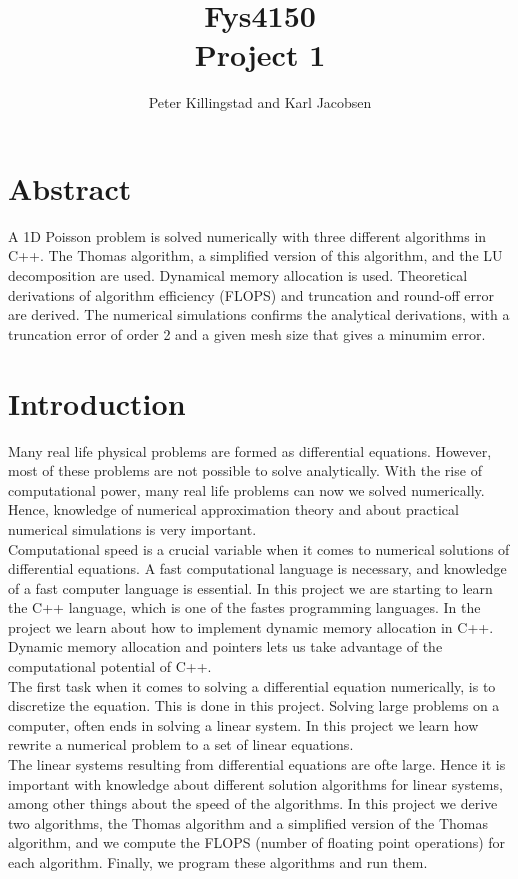 \documentclass{article}
\title{Fys4150\\Project 1\\ }
\author{Peter Killingstad and Karl Jacobsen}
\begin{document}
	
\maketitle

\section*{Abstract}
A 1D Poisson problem is solved numerically with three different algorithms in C++. The Thomas algorithm, a simplified version of this algorithm, and the LU decomposition are used. Dynamical memory allocation is used. Theoretical derivations of algorithm efficiency (FLOPS) and truncation and round-off error are derived. The numerical simulations confirms the analytical derivations, with a truncation error of order 2 and a given mesh size that gives a minumim error.

\tableofcontents

\pagebreak


\section{Introduction}
Many real life physical problems are formed as differential equations. However, most of these problems are not possible to solve analytically. With the rise of computational power, many real life problems can now we solved numerically. Hence, knowledge of numerical approximation theory and about practical numerical simulations is very important.\\

Computational speed is a crucial variable when it comes to numerical solutions of differential equations. A fast computational language is necessary, and knowledge of a fast computer language is essential. In this project we are starting to learn the C++ language, which is one of the fastes programming languages. In the project we learn about how to implement dynamic memory allocation in C++. Dynamic memory allocation and pointers lets us take advantage of the computational potential of C++.\\

The first task when it comes to solving a differential equation numerically, is to discretize the equation. This is done in this project. Solving large problems on a computer, often ends in solving a linear system. In this project we learn how rewrite a numerical problem to a set of linear equations. \\

The linear systems resulting from differential equations are ofte large. Hence it is important with knowledge about different solution algorithms for linear systems, among other things about the speed of the algorithms. In this project we derive two algorithms, the Thomas algorithm and a simplified version of the Thomas algorithm, and we compute the FLOPS (number of floating point operations) for each algorithm. Finally, we program these algorithms and run them.\\
\end{document}
